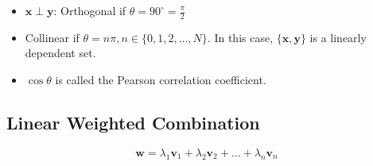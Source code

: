 \begin{itemize}
    \item $\mathbf{x} \perp \mathbf{y}$: Orthogonal if $\theta = 90^\circ = \frac{\pi}{2}$
    \item Collinear if $\theta = n \pi, n \in \{0, 1, 2, \dots, N\}$.
    In this case, $\{\mathbf{x}, \mathbf{y}\}$ is a linearly dependent set.
    \item $\cos \theta$ is called the Pearson correlation coefficient.
\end{itemize}

\subsection{Linear Weighted Combination}

\begin{equation}
    \mathbf{w} = \lambda_1 \mathbf{v}_1 + \lambda_2 \mathbf{v}_2 + \dots + \lambda_n \mathbf{v}_n
\end{equation}
